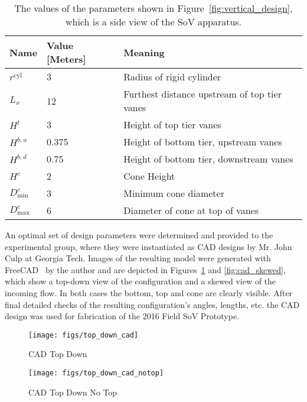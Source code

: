 \begin{table}[]
 \caption{The values of the parameters shown in
 Figure~\ref{fig:vertical_design}, which is a side view of the SoV
 apparatus.} 
\centering
\begin{tabular}{l|l|l}
Name                        & Value [Meters] & Meaning                    \\
 \hline
$r^{\text{cyl}}$            &   3   & Radius of rigid cylinder \\
$L_x$                       &  12   & Furthest distance upstream of top	 tier vanes \\
 $H^t    $                  &   3   & Height of top tier vanes \\
 $H^{b,u}$                  & 0.375 & Height of bottom tier, upstream vanes \\
 $H^{b,d}$                  & 0.75  & Height of bottom tier, downstream vanes \\
 $H^{c}$                    &   2   & Cone Height \\
 $D^c_{\text{min}}    $     &   3   & Minimum cone diameter \\
 $D^c_{\text{max}}    $     &   6   & Diameter of cone at top of vanes\\
\end{tabular}
 \label{tab:side}
\end{table}

An optimal set of design parameters were determined and provided to the
experimental group, where they were instantiated as CAD designs by
Mr. John Culp at Georgia Tech. Images of the resulting model were generated
with FreeCAD~\cite{Falck} by the author and are
depicted in Figures~\ref{fig:top_down_cad} and \ref{fig:cad_skewed},
which show a top-down view of the configuration and a skewed
view of the incoming flow. In both cases the bottom, top and cone are
clearly visible. After final detailed checks of the resulting
configuration's angles, lengths, etc. the CAD design was used for
fabrication of the 2016 Field SoV Prototype. 

\begin{figure}[!htb]
  \begin{center}
   \texttt{[image: figs/top\_down\_cad]}
   \caption{CAD Top Down}
   \label{fig:top_down_cad}
  \end{center}
 \end{figure}

\begin{figure}[!htb]
  \begin{center}
   \texttt{[image: figs/top\_down\_cad\_notop]}
   \caption{CAD Top Down No Top}
   \label{fig:top_down_cad_notop}
  \end{center}
 \end{figure}

